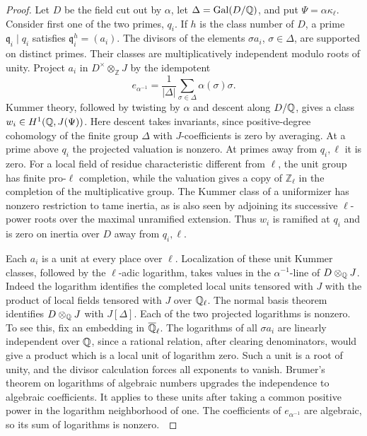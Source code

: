 \documentclass[a4paper,11pt]{article}
\theoremstyle{definition}
\theoremstyle{remark}
\newcommand{\ZZ}{\mathbb Z}\newcommand{\ord}{\operatorname{ord}}
\numberwithin{equation}{section}
\begin{document}
\begin{proof}
Let \(D\) be the field cut out by \(\alpha\), let
\(\Delta=\operatorname{Gal}(D/\mathbb Q)\), and put \(\Psi=\alpha\kappa_\ell\).
Consider first one of the two primes, \(q_i\). If \(h\) is the class
number of \(D\), a prime \(\mathfrak q_i\mid q_i\) satisfies
\(\mathfrak q_i^h=(a_i)\). The divisors of the elements
\(\sigma a_i\), \(\sigma\in\Delta\), are supported on distinct primes.
Their classes are multiplicatively independent modulo roots of unity.
Project \(a_i\) in \(D^\times\otimes_{\ZZ}J\) by the idempotent
\[
      e_{\alpha^{-1}}=\frac1{|\Delta|}
                   \sum_{\sigma\in\Delta}\alpha(\sigma)\sigma .
\]
Kummer theory, followed by twisting by \(\alpha\) and descent along
\(D/\mathbb Q\), gives a class \(w_i\in H^1(\mathbb Q,J(\Psi))\).
Here descent takes invariants, since positive-degree cohomology of the
finite group \(\Delta\) with \(J\)-coefficients is zero by averaging.
At a prime above \(q_i\) the projected valuation is nonzero. At primes
away from \(q_i,\ell\) it is zero. For a local field of residue
characteristic different from \(\ell\), the unit group has finite
pro-\(\ell\) completion, while the valuation gives a copy of
\(\ZZ_\ell\) in the completion of the multiplicative group.
The Kummer class of a uniformizer has nonzero restriction to tame
inertia, as is also seen by adjoining its successive \(\ell\)-power
roots over the maximal unramified extension. Thus \(w_i\) is ramified
at \(q_i\) and is zero on inertia over \(D\) away from \(q_i,\ell\).

Each \(a_i\) is a unit at every place over \(\ell\). Localization of
these unit Kummer classes, followed by the \(\ell\)-adic logarithm,
takes values in the \(\alpha^{-1}\)-line of \(D\otimes_{\mathbb Q}J\).
Indeed the logarithm identifies the completed local units tensored
with \(J\) with the product of local fields tensored with \(J\) over
\(\mathbb Q_\ell\). The normal basis theorem identifies \(D\otimes_{\mathbb Q}J\)
with \(J[\Delta]\). Each of the two projected logarithms is nonzero.
To see this, fix an embedding in \(\overline{\mathbb Q}_\ell\).
The logarithms of all \(\sigma a_i\) are linearly independent over
\(\mathbb Q\), since a rational relation, after clearing denominators,
would give a product which is a local unit of logarithm zero.
Such a unit is a root of unity, and the divisor calculation forces
all exponents to vanish. Brumer's theorem on logarithms of algebraic
numbers upgrades the independence to algebraic coefficients. It
applies to these units after taking a common positive power in the
logarithm neighborhood of one. The coefficients of
\(e_{\alpha^{-1}}\) are algebraic, so its sum of logarithms is
nonzero.~\cite{VI-IV-brumer330}


\end{proof}
\end{document}
